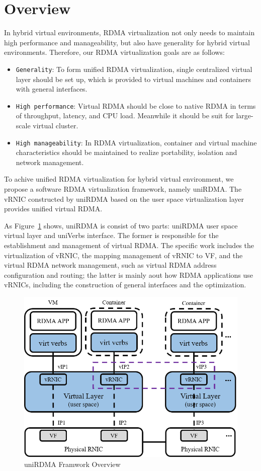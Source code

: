 \section{Overview}

In hybrid virtual environments, RDMA virtualization not only needs to maintain high performance and manageability, but also have generality for hybrid virtual environments. Therefore, our RDMA virtualization goals are as follows:

\begin{itemize}
\item {\verb|Generality|}: To form unified RDMA virtualization, single centralized virtual layer should be set up, which is provided to virtual machines and containers with general interfaces.
\item {\verb|High performance|}: Virtual RDMA should be close to native RDMA in terms of throughput, latency, and CPU load. Meanwhile it should be suit for large-scale virtual cluster.
\item {\verb|High manageability|}: In RDMA virtualization, container and virtual machine characteristics should be maintained to realize portability, isolation and network management.
\end{itemize}

To achive unified RDMA virtualization for hybrid virtual environment,  we propose a software RDMA virtualization framework, namely uniRDMA. The vRNIC constructed by uniRDMA based on the user space virtualization layer provides unified virtual RDMA.

As Figure~\ref{fig:framework-overview} shows, uniRDMA is consist of two parts: uniRDMA user space virtual layer and uniVerbs interface. The former is responsible for the establishment and management of virtual RDMA. The specific work includes the virtualization of vRNIC, the mapping management of vRNIC to VF, and the virtual RDMA network management, such as virtual RDMA address configuration and routing; the latter is mainly aout how RDMA applications use vRNICs, including the construction of general interfaces and the optimization.

\begin{figure}[!ht]
	\centering
	\includegraphics[width=0.9\linewidth]{images/framework-overview}
	\caption{uniRDMA Framwork Overview}
	\label{fig:framework-overview}
\end{figure}
